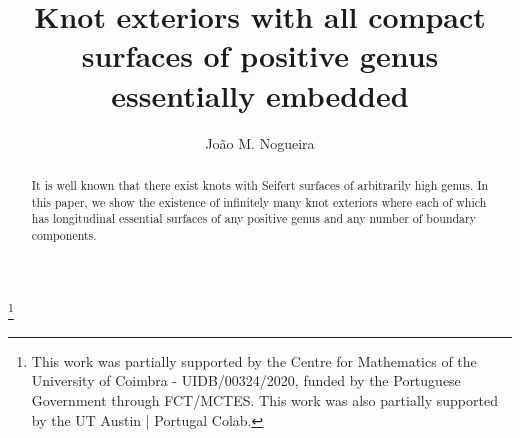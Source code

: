 \documentclass[reqno]{amsart}
\theoremstyle{definition}
\theoremstyle{remark}
\begin{document}
\title[Knot exteriors with all positive genus surfaces]{Knot exteriors with all compact surfaces of positive genus essentially embedded}



\author{Jo\~{a}o M. Nogueira}
\address{University of Coimbra, CMUC, Department of Mathematics,  Apartado 3008, 3001-454 Coimbra, Portugal\\ nogueira@mat.uc.pt}
\thanks{This work was partially supported by the Centre for Mathematics of the University of Coimbra - UIDB/00324/2020, funded by the Portuguese Government through FCT/MCTES.  This work was also partially supported by the UT Austin | Portugal Colab. } %






\maketitle


\begin{abstract} It is well known that there exist knots with Seifert surfaces of arbitrarily high genus. In this paper, we show the existence of infinitely many knot exteriors where each of which has longitudinal essential surfaces of any positive genus and any number of boundary components.
\end{abstract}
\end{document}
